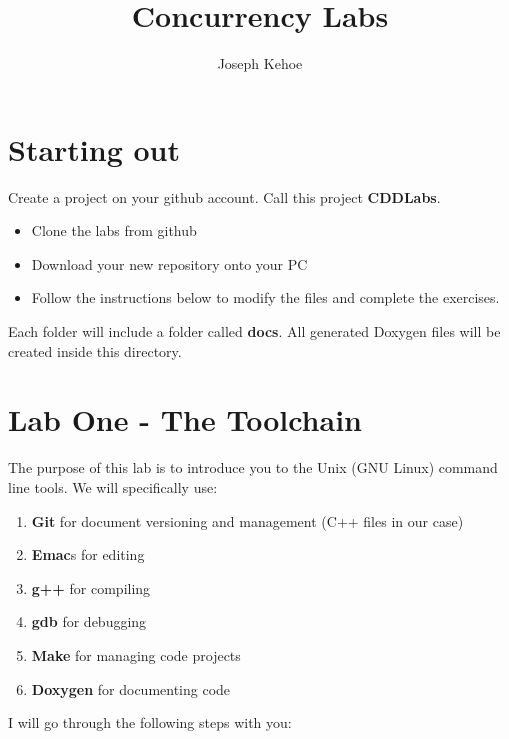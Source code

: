 \documentclass[10pt,a4paper]{article}
\author{Joseph Kehoe}
\title{Concurrency Labs}
\begin{document}
\section{Starting out}
Create a project on your github account. Call this project \textbf{CDDLabs}. 
\begin{itemize}
\item Clone the labs from github
\item Download your new repository onto your PC
\item Follow the instructions below to modify the files and complete the exercises.
\end{itemize}

Each folder will include a folder called \textbf{docs}.  All generated Doxygen files will be created inside this directory.
\section{Lab One - The Toolchain}
The purpose of this lab is to introduce you to the Unix (GNU Linux) command line tools. We will specifically use:
\begin{enumerate}
\item \textbf{Git} for document versioning and management (C++ files in our case)
\item \textbf{Emac}s for editing
\item \textbf{g++} for compiling
\item \textbf{gdb} for debugging
\item \textbf{Make} for managing code projects
\item \textbf{Doxygen} for documenting code
\end{enumerate}



I will go through the following steps with you:
\end{document}
